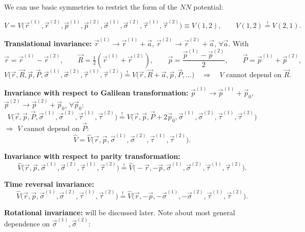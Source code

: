 \documentclass[11pt,a4paper]{article}
\newcommand{\op}[1]{\hat{#1}}
\begin{document}
We can use basic symmetries to restrict the form of the $NN$ potential:

\[
V=V\big(\vec r^{(1)},\vec r^{(2)},\vec p^{(1)},\vec p^{(2)},\vec\sigma^{(1)},\vec\sigma^{(2)},
\vec\tau^{(1)},\vec\tau^{(2)}\big)\equiv V(1,2),
\qquad
V(1,2)\stackrel{!}{=}V(2,1).
\]

\textbf{Translational invariance:} $\vec r^{(1)}\to\vec r^{(1)}+\vec a$,
$\vec r^{(2)}\to\vec r^{(2)}+\vec a$, $\forall\vec a$. With
\[
\vec r=\vec r^{(1)}-\vec r^{(2)},\qquad \vec R=\tfrac12(\vec r^{(1)}+\vec r^{(2)}),\qquad
\vec p=\frac{\vec p^{(1)}-\vec p^{(2)}}{2},\qquad \vec P=\vec p^{(1)}+\vec p^{(2)},
\]
\[
V\big(\vec r,\vec R,\vec p,\vec P,\vec\sigma^{(1)},\vec\sigma^{(2)},\vec\tau^{(1)},\vec\tau^{(2)}\big)
\stackrel{!}{=}V\big(\vec r,\vec R+\vec a,\vec p,\vec P,\dots\big)
\quad\Rightarrow\quad V \text{ cannot depend on } \vec R .
\]

\textbf{Invariance with respect to Galilean transformation:}
$\vec p^{(1)}\to\vec p^{(1)}+\vec p_0$, $\vec p^{(2)}\to\vec p^{(2)}+\vec p_0$, $\forall\vec p_0$:
\[
V\big(\vec r,\vec p,\vec P,\vec\sigma^{(1)},\vec\sigma^{(2)},\vec\tau^{(1)},\vec\tau^{(2)}\big)
\stackrel{!}{=}V\big(\vec r,\vec p,\vec P+2\vec p_0,\vec\sigma^{(1)},\vec\sigma^{(2)},\vec\tau^{(1)},\vec\tau^{(2)}\big)
\]
$\Rightarrow$ $V$ cannot depend on $\vec P$:
\[
\op V=\op V\big(\vec r,\vec p,\vec\sigma^{(1)},\vec\sigma^{(2)},\vec\tau^{(1)},\vec\tau^{(2)}\big).
\]

\textbf{Invariance with respect to parity transformation:}
\[
\op V\big(\vec r,\vec p,\vec\sigma^{(1)},\vec\sigma^{(2)},\vec\tau^{(1)},\vec\tau^{(2)}\big)
\stackrel{!}{=}\op V\big(-\vec r,-\vec p,\vec\sigma^{(1)},\vec\sigma^{(2)},\vec\tau^{(1)},\vec\tau^{(2)}\big).
\]

\textbf{Time reversal invariance:}
\[
\op V\big(\vec r,\vec p,\vec\sigma^{(1)},\vec\sigma^{(2)},\vec\tau^{(1)},\vec\tau^{(2)}\big)
\stackrel{!}{=}\op V\big(\vec r,-\vec p,-\vec\sigma^{(1)},-\vec\sigma^{(2)},\vec\tau^{(1)},\vec\tau^{(2)}\big).
\]

\textbf{Rotational invariance:}
will be discussed later.
\newline
\newline
Note about most general dependence on \texorpdfstring{$\vec\sigma^{(1)},\vec\sigma^{(2)}$}{sigma1, sigma2}:
\end{document}

